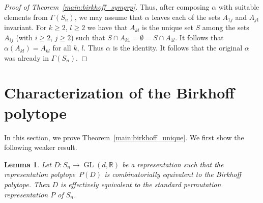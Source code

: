 \documentclass[10pt]{amsart}
\newtheorem{lemma}{Lemma}[section]
\renewcommand{\geq}{\geqslant}
\newcommand{\reals}{\mathbb{R}}
\DeclareMathOperator{\GL}{GL}
\begin{document}
\begin{proof}[Proof of Theorem~\ref{main:birkhoff_symgrp}]
  Thus, after composing $\alpha$ with suitable elements
  from $\Gamma(S_n)$, 
  we may assume that $\alpha$ leaves each of the sets
  $A_{1j}$ and $A_{j1}$ invariant.
  For $k\geq 2$, $l\geq 2$ we have that
  $A_{kl}$ is the unique set $S$ among the sets
  $A_{ij}$ (with $i\geq 2$, $j\geq 2$)
  such that $S\cap A_{k1}=\emptyset = S\cap A_{1l}$.
  It follows that
  $\alpha(A_{kl})=A_{kl}$ for all $k$, $l$.
  Thus $\alpha$ is the identity.
  It follows that the original $\alpha$ was already in 
  $\Gamma(S_n)$. 
\end{proof}
\section{Characterization of the Birkhoff polytope}
In this section, we prove Theorem~\ref{main:birkhoff_unique}.
We first show the following weaker result.

\begin{lemma}\label{l:snbirk_unique}
  Let $D\colon S_n \to \GL(d,\reals)$ be a representation 
  such that the representation polytope~$P(D)$ is combinatorially
  equivalent to the Birkhoff polytope.
  Then $D$ is effectively equivalent to 
  the standard permutation representation $P$ of $S_n$.  
\end{lemma}
\end{document}
